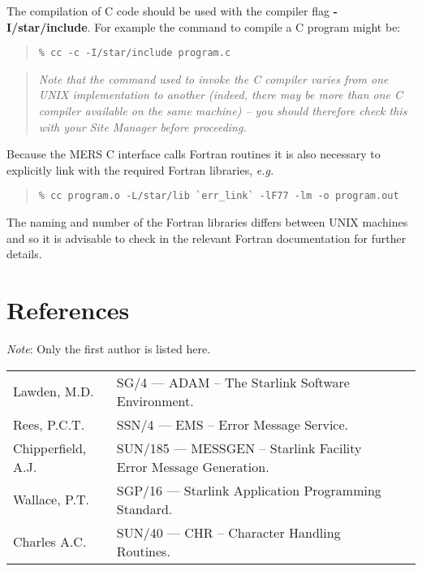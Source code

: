 \documentclass[twoside,11pt]{article}
\newcommand{\xref}[3]{#1}
\newcommand{\xlabel}[1]{}
\renewcommand{\_}{\texttt{\symbol{95}}}
\begin{document}
The compilation of C code should be used with the compiler flag
\textbf{-I/star/include}.
For example the command to compile a C program might be:
\begin {quote}
\begin{verbatim}
% cc -c -I/star/include program.c
\end{verbatim}
\end {quote}

\begin {quote}
\emph{Note that the command used to invoke the C compiler varies from
one UNIX implementation to another (indeed, there may be more than one C
compiler available on the same machine) -- you should therefore check this
with your Site Manager before proceeding.}
\end {quote}
Because the MERS C interface calls Fortran routines it is also necessary to
explicitly link with the required Fortran libraries, \textit{e.g.}
\begin {quote}
\begin{verbatim}
% cc program.o -L/star/lib `err_link` -lF77 -lm -o program.out
\end{verbatim}
\end {quote}
The naming and number of the Fortran libraries differs between UNIX machines
and so it is advisable to check in the relevant Fortran documentation for
further details.

\section{\xlabel{references}References}
\emph{Note}: Only the first author is listed here.

\begin {tabular}{lll}
Lawden, M.D. & \xref{SG/4}{sg4}{}
--- ADAM -- The Starlink Software Environment.\\
Rees, P.C.T. & \xref{SSN/4}{ssn4}{}
--- EMS -- Error Message Service.\\
Chipperfield, A.J. & \xref{SUN/185}{sun185}{}
--- MESSGEN -- Starlink Facility Error Message Generation.\\
Wallace, P.T. & \xref{SGP/16}{sgp16}{}
--- Starlink Application Programming Standard.\\
Charles A.C. & \xref{SUN/40}{sun40}{}
--- CHR -- Character Handling Routines.
\end {tabular}

\end{document}
